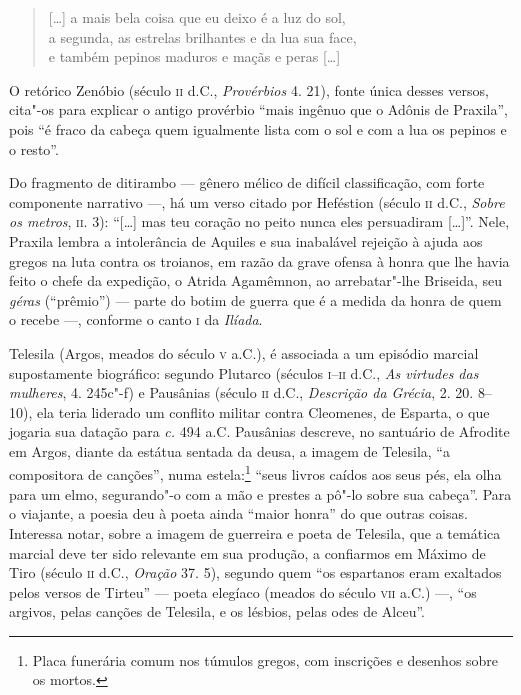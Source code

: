 \begin{quote}
\mbox[\ldots{}] a mais bela coisa que eu deixo é a luz do sol,\\
a segunda, as estrelas brilhantes e da lua sua face,\\
e também pepinos maduros e maçãs e peras [\ldots{}]
\end{quote}

O retórico Zenóbio (século \textsc{ii} d.C., \textit{Provérbios} 4. 21), fonte única
desses versos, cita"-os para explicar o antigo provérbio ``mais ingênuo
que o Adônis de Praxila”, pois “é fraco da cabeça quem igualmente
lista com o sol e com a lua os pepinos e o resto”.

Do fragmento de ditirambo --- gênero mélico de difícil classificação, com forte
componente narrativo ---, há um verso citado por Heféstion (século \textsc{ii} d.C.,
\textit{Sobre os metros}, \textsc{ii}. 3): ``[\ldots{}] mas teu coração no peito nunca
eles persuadiram [\ldots{}]”. Nele, Praxila lembra a intolerância de Aquiles e sua
inabalável rejeição à ajuda aos gregos na luta contra os troianos, em razão da
grave ofensa à honra que lhe havia feito o chefe da expedição, o Atrida
Agamêmnon, ao arrebatar"-lhe Briseida, seu \textit{géras} (“prêmio”) --- parte do
botim de guerra que é a medida da honra de quem o recebe ---, conforme o canto \textsc{i}
da \textit{Ilíada}.

Telesila (Argos, meados do século \textsc{v} a.C.), é associada a um episódio marcial
supostamente biográfico: segundo Plutarco (séculos \textsc{i}--\textsc{ii} d.C., \textit{As
virtudes das mulheres}, 4. 245c"-f) e Pausânias (século \textsc{ii} d.C.,
\textit{Descrição da Grécia}, 2. 20. 8--10), ela teria liderado um conflito
militar contra Cleomenes, de Esparta, o que jogaria sua datação para \textit{c.}
494 a.C. Pausânias descreve, no santuário de Afrodite em Argos, diante da
estátua sentada da deusa, a imagem de Telesila, ``a compositora de
canções”, numa estela:\footnote{ Placa funerária comum nos túmulos gregos, com
inscrições e desenhos sobre os mortos.} ``seus livros caídos aos seus
pés, ela olha para um elmo, segurando"-o com a mão e prestes a pô"-lo sobre sua
cabeça”. Para o viajante, a poesia deu à poeta ainda ``maior honra” do
que outras coisas. Interessa notar, sobre a imagem de guerreira e poeta de
Telesila, que a temática marcial deve ter sido relevante em sua produção, a
confiarmos em Máximo de Tiro (século \textsc{ii} d.C., \textit{Oração} 37. 5), segundo
quem ``os espartanos eram exaltados pelos versos de Tirteu” --- 
poeta elegíaco (meados do século \textsc{vii} a.C.) ---, ``os argivos, pelas
canções de Telesila, e os lésbios, pelas odes de Alceu”. 

